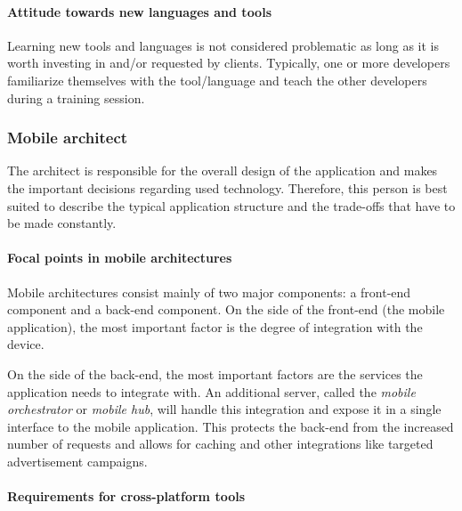 \paragraph{Attitude towards new languages and tools} 

Learning new tools and languages is not considered problematic as long as it is worth investing in and/or requested by clients. Typically, one or more developers familiarize themselves with the tool/language and teach the other developers during a training session.

\subsubsection{Mobile architect}

The architect is responsible for the overall design of the application and makes the important decisions regarding used technology. Therefore, this person is best suited to describe the typical application structure and the trade-offs that have to be made constantly.

\paragraph{Focal points in mobile architectures} 

Mobile architectures consist mainly of two major components: a front-end component and a back-end component. On the side of the front-end (the mobile application), the most important factor is the degree of integration with the device.

On the side of the back-end, the most important factors are the services the application needs to integrate with. An additional server, called the \emph{mobile orchestrator} or \emph{mobile hub}, will handle this integration and expose it in a single interface to the mobile application. This protects the back-end from the increased number of requests and allows for caching and other integrations like targeted advertisement campaigns.

\paragraph{Requirements for cross-platform tools}

